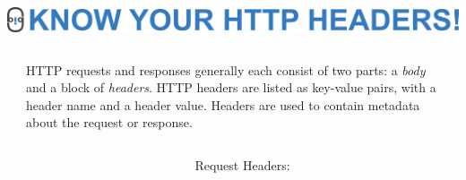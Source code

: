 \documentclass[final]{beamer}
\begin{document}
  \begin{frame}{}
    \begin{minipage}{\textwidth}
      \centering
      \includegraphics[]{./title-headers.png}
    \end{minipage}

    \vspace{0.5in}

    \begin{columns}
      \begin{column}{0.2\textwidth}
      \end{column}
      \begin{column}{0.6\textwidth}
        \begin{block}{}
          \large
            HTTP requests and responses generally each consist of two parts: a
            \emph{body} and a block of \emph{headers}. HTTP headers are listed
            as key-value pairs, with a header name and a header value. Headers
            are used to contain metadata about the request or response.
          \normalsize
        \end{block}
      \end{column}
      \begin{column}{0.2\textwidth}
      \end{column}
    \end{columns}

    \vspace{1.0in}

    \begin{columns}
      \begin{column}{0.1\textwidth}
      \end{column}
      \begin{column}{0.4\textwidth}
        \begin{block}{\huge{Request Headers:}}

          \vspace{0.3in}


\end{block}
\end{column}
\end{columns}
\end{frame}
\end{document}
